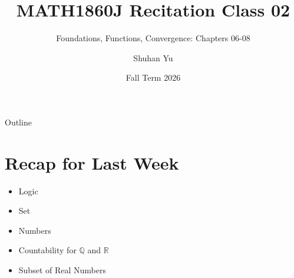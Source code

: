 \documentclass[dvipsnames]{beamer}
\title{MATH1860J Recitation Class 02}
\subtitle{Foundations, Functions, Convergence: Chapters 06-08}
\author{Shuhan Yu}
\institute{SJTU Global College}
\date{Fall Term 2026}
\theoremstyle{plain}
\theoremstyle{definition}
\begin{document}

\begin{frame}
    \titlepage
\end{frame}

\begin{frame}{Outline}
    \tableofcontents
\end{frame}

\section{Recap for Last Week}
\begin{frame}
\begin{itemize}
  \huge
  \item Logic
  \item Set
  \item Numbers
  \item Countability for $\mathbb{Q}$ and $\mathbb{R}$
  \item Subset of Real Numbers
\end{itemize}
\end{frame}
\end{document}
